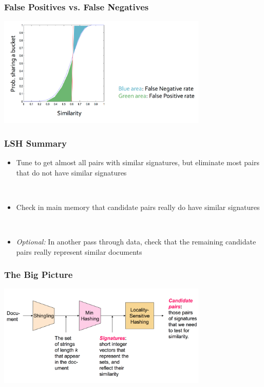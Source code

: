 \documentclass[svgnames]{beamer}
\begin{document}
  
\begin{frame} \frametitle{False Positives vs. False Negatives}
\includegraphics[width=10cm]{tradeoff}
\end{frame}

  
\begin{frame} \frametitle{LSH Summary}
\begin{itemize}
\item Tune to get almost all pairs with similar signatures, but eliminate most pairs that do not have similar signatures

~\\
\item Check in main memory that candidate pairs really do have similar signatures

~\\

\item {\it Optional:} In another pass through data, check that the remaining candidate pairs really represent similar documents
\end{itemize}
\end{frame}

  
\begin{frame} \frametitle{The Big Picture}
\includegraphics[width=10cm]{overall}
\end{frame}


\end{document}
